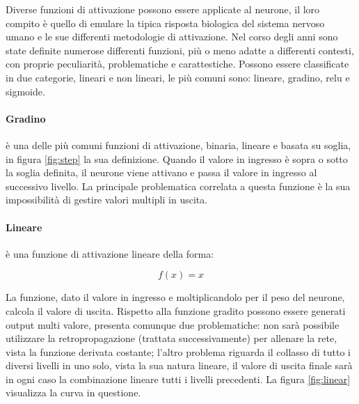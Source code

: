 \documentclass[%
    corpo=12pt,
    twoside,
    oldstyle,
    autoretitolo,
    greek,
    evenboxes,
]{toptesi}
\begin{document}
Diverse funzioni di attivazione possono essere applicate al neurone, il loro compito è quello di emulare la tipica risposta biologica del sistema nervoso umano e le sue differenti metodologie di attivazione. Nel corso degli anni sono state definite numerose differenti funzioni, più o meno adatte a differenti contesti, con proprie peculiarità, problematiche e carattestiche. Possono essere classificate in due categorie, lineari e non lineari, le più comuni sono: lineare, gradino, relu e sigmoide.

\paragraph{Gradino} è una delle più comuni funzioni di attivazione, binaria, lineare e basata su soglia, in figura \ref{fig:step} la sua definizione. Quando il valore in ingresso è sopra o sotto la soglia definita, il neurone viene attivano e passa il valore in ingresso al successivo livello. La principale problematica correlata a questa funzione è la sua impossibilità di gestire valori multipli in uscita.

\paragraph{Lineare} è una funzione di attivazione lineare della forma:
\begin{center}
  \begin{equation}
    f(x) = x
  \end{equation}
\end{center}
La funzione, dato il valore in ingresso e moltiplicandolo per il peso del neurone, calcola il valore di uscita. Rispetto alla funzione gradito possono essere generati output multi valore, presenta comunque due problematiche: non sarà possibile utilizzare la retropropagazione (trattata successivamente) per allenare la rete, vista la funzione derivata costante; l'altro problema riguarda il collasso di tutto i diversi livelli in uno solo, vista la sua natura lineare, il valore di uscita finale sarà in ogni caso la combinazione lineare tutti i livelli precedenti. La figura \ref{fig:linear} visualizza la curva in questione.
\end{document}
